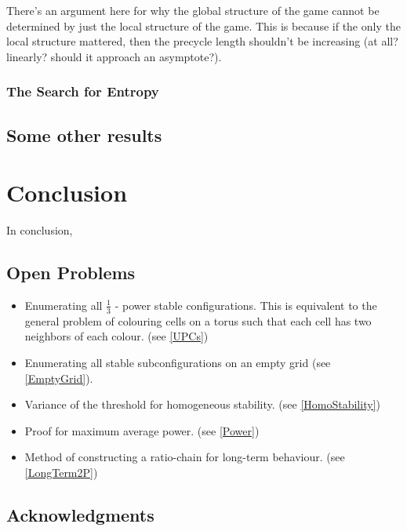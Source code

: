 \documentclass[12pt]{article}
\theoremstyle{definition}
\theoremstyle{remark}
\theoremstyle{remark}
\begin{document}
\par
There's an argument here for why the global structure of the game cannot be determined by just the local structure of the game. This is because if the only the local structure mattered, then the precycle length shouldn't be increasing (at all? linearly? should it approach an asymptote?).

\subsubsection{The Search for Entropy}

\subsection{Some other results}


\section{Conclusion}

In conclusion, 

\subsection{Open Problems}
\begin{itemize}
\item
Enumerating all $\frac{1}{3}$ - power stable configurations. This is equivalent to the general problem of colouring cells on a torus such that each cell has two neighbors of each colour. (see \ref{UPCs})
\item
Enumerating all stable subconfigurations on an empty grid (see \ref{EmptyGrid}).
\item
Variance of the threshold for homogeneous stability. (see \ref{HomoStability})
\item
Proof for maximum average power. (see \ref{Power})
\item
Method of constructing a ratio-chain for long-term behaviour. (see \ref{LongTerm2P})
\end{itemize}

\subsection{Acknowledgments}
\end{document}
